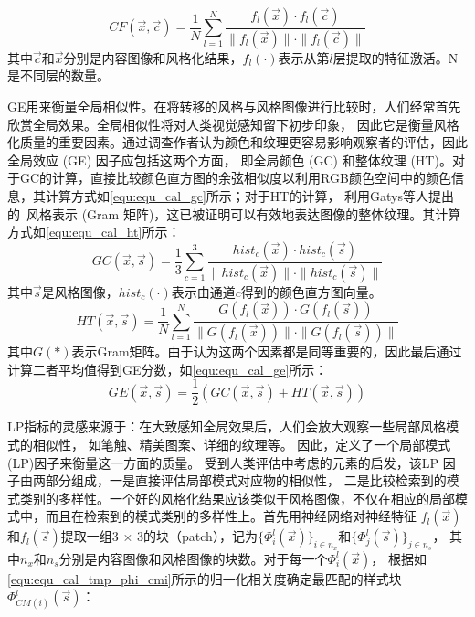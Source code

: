 \begin{equation}
    \label{equ:equ_cal_cf}
    CF(\vec{x},\vec{c})=\frac1N\sum_{l=1}^N\frac{f_l(\vec{x})\cdot f_l(\vec{c})}{\parallel f_l(\vec{x})\parallel\cdot\parallel f_l(\vec{c})\parallel}
\end{equation}
其中$\vec{c}$和$\vec{x}$分别是内容图像和风格化结果，\(f_l(\cdot)\)表示从第$l$层提取的特征激活。N是不同层的数量。
\par GE用来衡量全局相似性。在将转移的风格与风格图像进行比较时，人们经常首先欣赏全局效果。全局相似性将对人类视觉感知留下初步印象，
因此它是衡量风格化质量的重要因素。通过调查作者认为颜色和纹理更容易影响观察者的评估，因此全局效应 (GE) 因子应包括这两个方面，
即全局颜色 (GC) 和整体纹理 (HT)。对于GC的计算，直接比较颜色直方图的余弦相似度以利用RGB颜色空间中的颜色信息，其计算方式如\autoref{equ:equ_cal_gc}所示；对于HT的计算，
利用Gatys等人提出的~\cite{gatys2016image,gatys2017controlling}风格表示 (Gram 矩阵)，这已被证明可以有效地表达图像的整体纹理。其计算方式如\autoref{equ:equ_cal_ht}所示：
\begin{equation}
    \label{equ:equ_cal_gc}
    GC(\vec{x},\vec{s})=\frac13\sum_{c=1}^3\frac{hist_c(\vec{x})\cdot hist_c(\vec{s})}{\parallel hist_c(\vec{x})\parallel\cdot\parallel hist_c(\vec{s})\parallel}
\end{equation}
其中$\vec{s}$是风格图像，\(hist_c(\cdot)\)表示由通道$c$得到的颜色直方图向量。
\begin{equation}
    \label{equ:equ_cal_ht}
    HT(\vec{x},\vec{s})=\frac1N\sum_{l=1}^N\frac{G(f_l(\vec{x}))\cdot G(f_l(\vec{s}))}{\parallel G(f_l(\vec{x}))\parallel\cdot\parallel G(f_l(\vec{s}))\parallel}
\end{equation}
其中$G(*)$表示Gram矩阵。由于认为这两个因素都是同等重要的，因此最后通过计算二者平均值得到GE分数，如\autoref{equ:equ_cal_ge}所示：
\begin{equation}
    \label{equ:equ_cal_ge}
    GE(\vec{x},\vec{s})=\frac12(GC(\vec{x},\vec{s})+HT(\vec{x},\vec{s}))
\end{equation}
\par LP指标的灵感来源于：在大致感知全局效果后，人们会放大观察一些局部风格模式的相似性，
如笔触、精美图案、详细的纹理等。
因此，定义了一个局部模式(LP)因子来衡量这一方面的质量。
受到人类评估中考虑的元素的启发，该LP 因子由两部分组成，一是直接评估局部模式对应物的相似性，
二是比较检索到的模式类别的多样性。一个好的风格化结果应该类似于风格图像，不仅在相应的局部模式中，而且在检索到的模式类别的多样性上。首先用神经网络对神经特征
\(f_l(\vec{x})\)和\(f_l(\vec{s})\)提取一组3 × 3的块（patch），记为\(\{\Phi_i^l(\vec{x})\}_{i\in n_x}\)和\(\{\Phi_j^l(\vec{s})\}_{j\in n_s}\)，
其中$n_x$和$n_s$分别是内容图像和风格图像的块数。对于每一个\(\Phi_i^l(\vec{x})\)，
根据如\autoref{equ:equ_cal_tmp_phi_cmi}所示的归一化相关度确定最匹配的样式块\(\Phi_{CM(i)}^l(\vec{s})\)：


